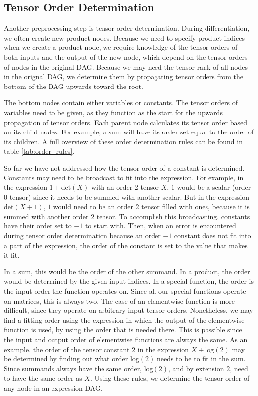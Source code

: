 \documentclass[12pt, a4paper]{report}
\begin{document}
\subsection{Tensor Order Determination}
Another preprocessing step is tensor order determination.
During differentiation, we often create new product nodes.
Because we need to specify product indices when we create a product node, we require knowledge of the tensor orders of both inputs and the output of the new node, which depend on the tensor orders of nodes in the original DAG.
Because we may need the tensor rank of all nodes in the orignal DAG, we determine them by propagating tensor orders from the bottom of the DAG upwards toward the root.

The bottom nodes contain either variables or constants.
The tensor orders of variables need to be given, as they function as the start for the upwards propagation of tensor orders.
Each parent node calculates its tensor order based on its child nodes.
For example, a sum will have its order set equal to the order of its children.
A full overview of these order determination rules can be found in table \ref{tab:order_rules}.

So far we have not addressed how the tensor order of a constant is determined.
Constants may need to be broadcast to fit into the expression.
For example, in the expression $1 + \text{det}(X)$ with an order 2 tensor $X$, $1$ would be a scalar (order 0 tensor) since it needs to be summed with another scalar.
But in the expression $\text{det}(X + 1)$, $1$ would need to be an order 2 tensor filled with ones, because it is summed with another order 2 tensor.
To accomplish this broadcasting, constants have their order set to $-1$ to start with.
Then, when an error is encountered during tensor order determination because an order $-1$ constant does not fit into a part of the expression, the order of the constant is set to the value that makes it fit.

In a sum, this would be the order of the other summand.
In a product, the order would be determined by the given input indices.
In a special function, the order is the input order the function operates on. Since all our special functions operate on matrices, this is always two.
The case of an elementwise function is more difficult, since they operate on arbitrary input tensor orders.
Nonetheless, we may find a fitting order using the expression in which the output of the elementwise function is used, by using the order that is needed there.
This is possible since the input and output order of elementwise functions are always the same.
As an example, the order of the tensor constant $2$ in the expression $X + \text{log}(2)$ may be determined by finding out what order $\text{log}(2)$ needs to be to fit in the sum.
Since summands always have the same order, $\text{log}(2)$, and by extension $2$, need to have the same order as $X$.
Using these rules, we determine the tensor order of any node in an expression DAG.
\end{document}
